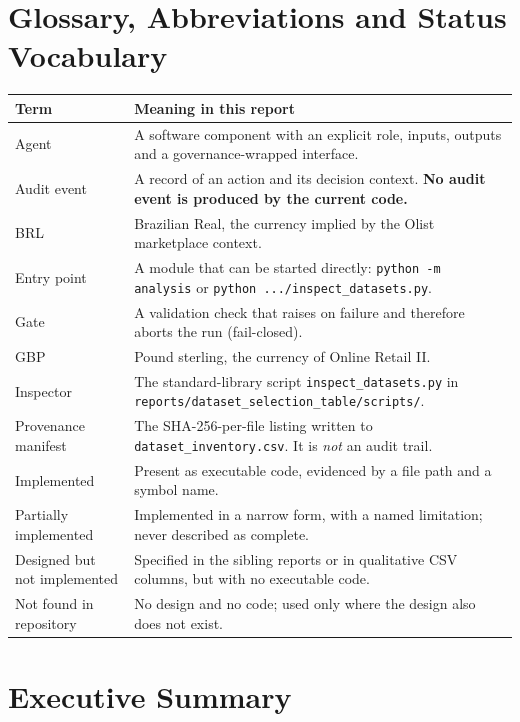 \documentclass[11pt,a4paper]{article}
\newcommand{\code}[1]{\texttt{#1}}
\begin{document}
\section*{Glossary, Abbreviations and Status Vocabulary}
\begin{tabularx}{\textwidth}{L{3.2cm}X}
\toprule
\textbf{Term} & \textbf{Meaning in this report} \\ \midrule
Agent & A software component with an explicit role, inputs, outputs and a governance-wrapped interface. \\ 
Audit event & A record of an action and its decision context. \textbf{No audit event is produced by the current code.} \\ 
BRL & Brazilian Real, the currency implied by the Olist marketplace context. \\ 
Entry point & A module that can be started directly: \code{python -m analysis} or \code{python .../inspect\_datasets.py}. \\ 
Gate & A validation check that raises on failure and therefore aborts the run (fail-closed). \\ 
GBP & Pound sterling, the currency of Online Retail II. \\ 
Inspector & The standard-library script \code{inspect\_datasets.py} in \code{reports/dataset\_selection\_table/scripts/}. \\ 
Provenance manifest & The SHA-256-per-file listing written to \code{dataset\_inventory.csv}. It is \emph{not} an audit trail. \\ 
Implemented & Present as executable code, evidenced by a file path and a symbol name. \\ 
Partially implemented & Implemented in a narrow form, with a named limitation; never described as complete. \\ 
Designed but not implemented & Specified in the sibling reports or in qualitative CSV columns, but with no executable code. \\ 
Not found in repository & No design and no code; used only where the design also does not exist. \\ 
\bottomrule
\end{tabularx}

\section{Executive Summary}
\end{document}

